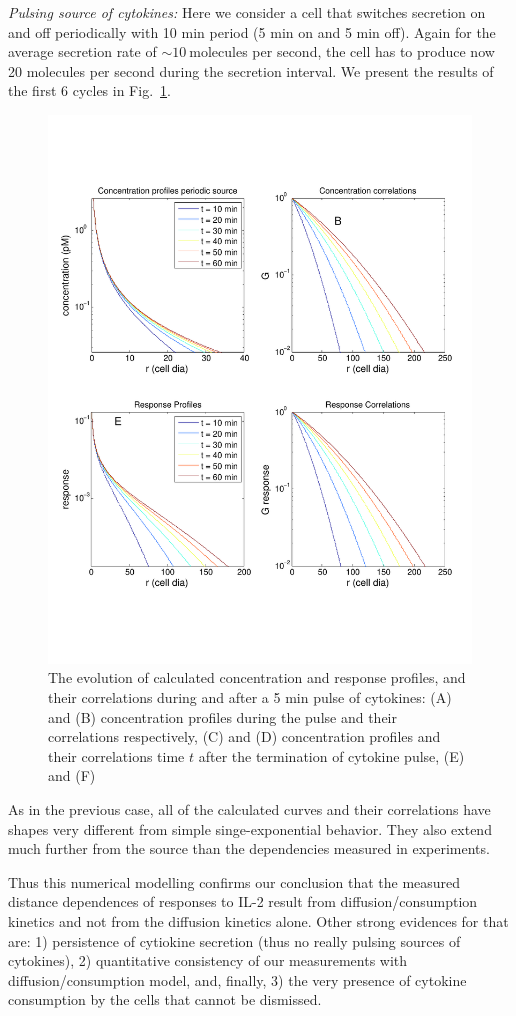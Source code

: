 \documentclass[11pt, oneside]{article}   	%
\begin{document}
\emph{Pulsing source of cytokines:} 
Here we consider a cell that switches secretion on and off periodically with 10 min period (5 min on and 5 min off).  Again for the average secretion rate of $\sim 10~$molecules per second, the cell has to produce now 20 molecules per second during the secretion interval. We present the results of the first 6 cycles in Fig.~\ref{Fig:periodic source}.

\begin{figure}[h!]
	\centering
		\includegraphics[width = 6 in]{TimeDependentProfilesPeriodic.pdf}
		\caption{\label{Fig:periodic source} The evolution of calculated concentration and response profiles, and their correlations during and after a 5 min pulse  of cytokines: (A) and (B) concentration profiles during the pulse and their correlations respectively, (C) and (D) concentration profiles and their correlations time $t$ after the termination of cytokine pulse, (E) and (F)}
\end{figure}

As in the previous case, all of the calculated curves and their correlations have shapes very different from simple singe-exponential behavior. They also extend much further from the source than the dependencies measured in experiments.

Thus this numerical modelling confirms our conclusion that the measured distance dependences of responses to IL-2 result from diffusion/consumption kinetics and not from the diffusion kinetics alone. Other strong evidences for that are: 1) persistence of cytiokine secretion (thus no really pulsing sources of cytokines), 2) quantitative consistency of our measurements with diffusion/consumption model, and, finally, 3) the very presence of cytokine consumption by the cells that cannot be dismissed.
\end{document}
